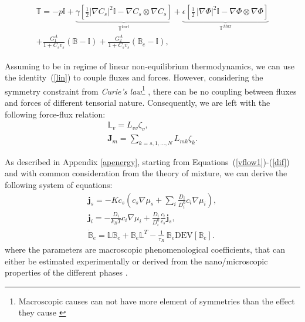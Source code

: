 \documentclass[runningheads]{llncs}
\newcommand{\F}{\ensuremath{\mathbb{F}}}
\newcommand{\LL}{\ensuremath{\mathbb{L}}}
\begin{document}
\begin{gather}
\begin{aligned}
\mathbb{T}= -p \mathbb{I} + \underbrace{\gamma \left[\frac{1}{2} |\nabla C_s|^2\mathbb{I} - \nabla C_s \otimes \nabla C_s\right]}_{\mathbb{T}^{kort}}+ \underbrace{\epsilon \left[\frac{1}{2} \,|\nabla \Phi|^2\mathbb{I} -\nabla \Phi \otimes \nabla \Phi\right]}_{\mathbb{T}^{Max}}\\
+ \frac{G^A_1}{1+C_sv_s}\left(\mathbb{B}-\mathbb{I}\right) + \frac{G^A_2}{1+C_sv_s}\left(\mathbb{B}_e-\mathbb{I}\right),
\end{aligned}
\label{sys3}
\end{gather}

Assuming to be in regime of linear non-equilibrium thermodynamics, we can use the identity~(\ref{lin}) to couple fluxes and forces. However, considering the symmetry constraint from \textit{Curie's law}\footnote{Macroscopic causes can not have more element of symmetries than the effect they cause \cite{CIT}} , there can be no coupling between fluxes and forces of different tensorial nature. Consequently, we are left with the following force-flux relation:
\begin{gather}
\LL_v = L_{vv} \zeta_v,\label{vflow2}\\
\mathbf{J}_m = \sum_{k=s,1,\ldots,N} L_{mk} \zeta_k. \label{dif}
\end{gather}


As described in Appendix \ref{apenergy}, starting from Equations~(\ref{vflow1})-(\ref{dif}) and with common consideration from the theory of mixture, we can derive the following system of equations:
\begin{eqnarray}
\mathbf{j}_s = -K c_s \left(c_s\nabla \mu_s +\sum_i \frac{D_i}{D^0_i} c_i \nabla \mu_i\right),\\
\mathbf{j}_i = - \frac{D_i}{k_B T}c_i\nabla \mu_i + \frac{D_i}{D^0_i} \frac{c_i}{c_s} \mathbf{j}_s, \\
\dot{\mathbb{B}}_e =\LL\mathbb{B}_e + \mathbb{B}_e \LL^T - \frac{1}{\tau_R} \,\mathbb{B}_e\text{DEV}[\mathbb{B}_e].\label{Be}
\end{eqnarray}
where the parameters are macroscopic phenomenological coefficients, that can either be estimated experimentally or derived from the nano/microscopic properties of the different phases \cite{ecm1,ecm2}. 
\end{document}
